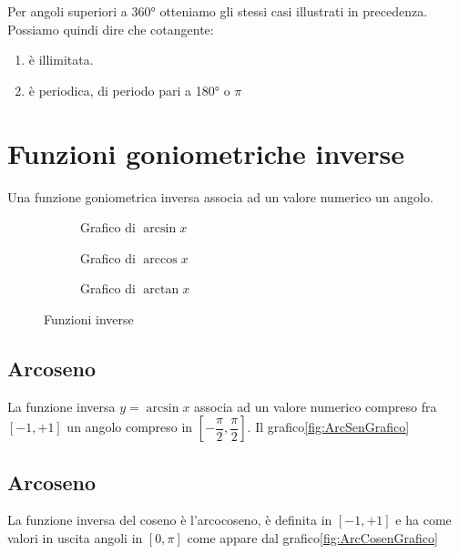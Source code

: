 Per angoli superiori a \ang{360} otteniamo gli stessi casi illustrati in precedenza. 
Possiamo quindi dire che cotangente:
\begin{enumerate}
	\item è illimitata.
	\item è periodica, di periodo pari a \ang{180} o $\pi$
\end{enumerate} 
\begin{figure}
	\centering
	
	\label{fig:AndamentoCotangente2}
\end{figure}%
\section{Funzioni goniometriche inverse}
Una funzione goniometrica inversa associa ad un valore numerico un angolo.
\begin{figure}
	\begin{subfigure}[b]{.5\linewidth}
		\centering
	
		\caption{Grafico di $\arcsin x$}\label{fig:ArcSenGrafico}
	\end{subfigure}%
	\begin{subfigure}[b]{.5\linewidth}
		\centering
	
		\caption{Grafico di $\arccos x$}\label{fig:ArcCosenGrafico}
	\end{subfigure}
		\begin{subfigure}[b]{\linewidth}
			\centering
	
		\caption{Grafico di $\arctan x$}\label{fig:ArcTangenteGrafico}
		\end{subfigure}
			\caption{Funzioni inverse}\label{tab:funzinverse_1}
\end{figure}
\subsection{Arcoseno}
La funzione inversa $y=\arcsin x$ associa ad un valore numerico compreso fra$[-1,+1]$ un angolo compreso in $[-\dfrac{\pi}{2},\dfrac{\pi}{2}]$. Il grafico\nobs\vref{fig:ArcSenGrafico} 
\subsection{Arcoseno}
La funzione inversa del coseno è l'arcocoseno, è definita  in $[-1,+1]$ e ha come valori in uscita angoli in $[0,\pi]$ come appare dal grafico\nobs\vref{fig:ArcCosenGrafico} 
